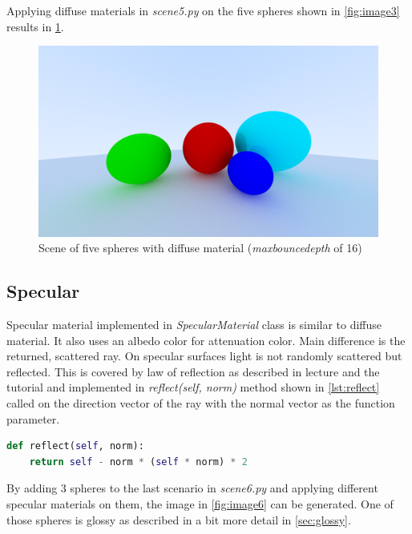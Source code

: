 \documentclass[]{article}
\begin{document}
		Applying diffuse materials in \emph{scene5.py} on the five spheres shown in \cref{fig:image3} results in \cref{fig:image5}.
		
		\begin{figure}[h]
			\centering
			\includegraphics[width=0.9\linewidth]{image5-5}
			\caption{Scene of five spheres with diffuse material (\emph{max\textunderscore bounce\textunderscore depth} of 16)}
			\label{fig:image5}
		\end{figure}
		 
		\subsection{Specular}
		Specular material implemented in \emph{SpecularMaterial} class is similar to diffuse material. It also uses an albedo color for attenuation color. Main difference is the returned, scattered ray. On specular surfaces light is not randomly scattered but reflected. This is covered by law of reflection as described in lecture and the tutorial and implemented in \emph{reflect(self, norm)} method shown in \cref{lst:reflect} called on the direction vector of the ray with the normal vector as the function parameter.
		
		\begin{lstlisting}[caption={Method for reflecting a vector on a normal vector}, language=Python, label=lst:reflect]
def reflect(self, norm):
	return self - norm * (self * norm) * 2
		\end{lstlisting}
		
		By adding 3 spheres to the last scenario in \emph{scene6.py} and applying different specular materials on them, the image in \cref{fig:image6} can be generated. One of those spheres is glossy as described in a bit more detail in \cref{sec:glossy}.
		
\end{document}
